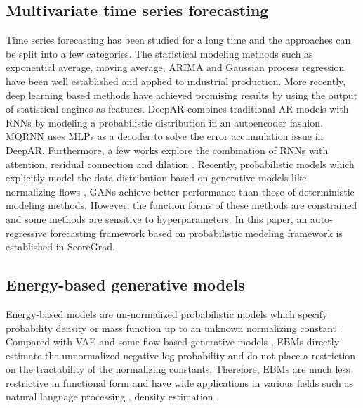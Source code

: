 \subsection{Multivariate time series forecasting}
Time series forecasting has been studied for a long time and the approaches can be split into a few categories. The statistical modeling methods such as exponential average, moving average, ARIMA \cite{box1968some} and Gaussian process regression have been well established and applied to industrial production. More recently, deep learning based methods have achieved promising results by using the output of statistical engines as features. DeepAR \cite{salinas2020deepar} combines traditional AR models with RNNs by modeling a probabilistic distribution in an autoencoder fashion. MQRNN \cite{wen2017multi} uses MLPs as a decoder to solve the error accumulation issue in DeepAR.
 Furthermore, a few works explore the combination of RNNs with attention, residual connection and dilation \cite{chang2017dilated,kim2017residual,qin2017dual}. Recently, probabilistic models which explicitly model the data distribution based on generative models like normalizing flows \cite{de2020normalizing}, GANs \cite{yoon2019time} achieve better performance than those of deterministic modeling methods. However, the function forms of these methods are constrained and some methods are sensitive to hyperparameters. In this paper, an auto-regressive forecasting framework based on probabilistic modeling framework is established in ScoreGrad.

\subsection{Energy-based generative models}
Energy-based models are un-normalized probabilistic models which specify probability density or mass function up to an unknown normalizing constant \cite{song2021train}. Compared with VAE \cite{kingma2013auto} and some flow-based generative models \cite{dinh2014nice,rezende2015variational}, EBMs directly estimate the unnormalized negative log-probability and do not place a restriction on the tractability of the normalizing constants. Therefore, EBMs are much less restrictive in functional form and have wide applications in various fields such as natural language processing \cite{mikolov2013distributed, deng2020residual}, density estimation \cite{wenliang2019learning,song2020sliced}.

